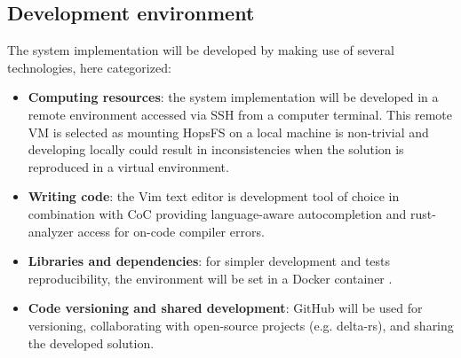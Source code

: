\subsection{Development environment}
The system implementation will be developed by making use of several technologies, here categorized:
\begin{itemize}
    \item \textbf{Computing resources}: the system implementation will be developed in a remote environment accessed via \gls{SSH} from a computer terminal. This remote \gls{VM} is selected as mounting \gls{HopsFS} on a local machine is non-trivial and developing locally could result in inconsistencies when the solution is reproduced in a virtual environment.
    \item \textbf{Writing code}: the Vim \cite{WelcomeHomeVim} text editor is development tool of choice in combination with \gls{CoC} \cite{NeoclideCocnvim2024} providing language-aware autocompletion and rust-analyzer \cite{fannFannheywardCocrustanalyzer2024} access for on-code compiler errors. 
    \item \textbf{Libraries and dependencies}: for simpler development and tests reproducibility, the environment will be set in a Docker container \cite{DockerBuild0200}.
    \item \textbf{Code versioning and shared development}: GitHub \cite{GitHub} will be used for versioning, collaborating with open-source projects (e.g. delta-rs), and sharing the developed solution.
\end{itemize}

 